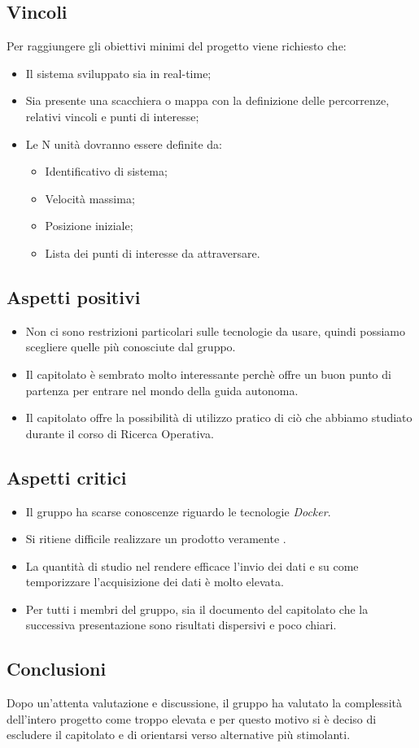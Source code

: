 \subsection{Vincoli}
Per raggiungere gli obiettivi minimi del progetto viene richiesto che:
\begin{itemize}
\item Il sistema sviluppato sia in real-time;
\item Sia presente una scacchiera o mappa con la definizione delle percorrenze, relativi vincoli e punti di interesse;
\item Le N unità dovranno essere definite da:
	\begin{itemize}
	\item Identificativo di sistema;
	\item Velocità massima;
	\item Posizione iniziale;
	\item Lista dei punti di interesse da attraversare.
	\end{itemize}
\end{itemize}

\subsection{Aspetti positivi}
\begin{itemize}
	\item Non ci sono restrizioni particolari sulle tecnologie da usare, quindi possiamo scegliere quelle più conosciute dal gruppo.
	\item Il capitolato è sembrato molto interessante perchè offre un buon punto di partenza per entrare nel mondo della guida autonoma.
	\item Il capitolato offre la possibilità di utilizzo pratico di ciò che abbiamo studiato durante il corso di Ricerca Operativa.
\end{itemize}

\subsection{Aspetti critici}
\begin{itemize}
	\item Il gruppo ha scarse conoscenze riguardo le tecnologie \textit{Docker}.
	\item Si ritiene difficile realizzare un prodotto veramente .
	\item La quantità di studio nel rendere efficace l'invio dei dati e su come temporizzare l'acquisizione dei dati è molto elevata.
	\item Per tutti i membri del gruppo, sia il documento del capitolato che la successiva presentazione sono risultati dispersivi e poco chiari. 
\end{itemize}

\subsection{Conclusioni}
Dopo un'attenta valutazione e discussione, il gruppo ha valutato la complessità dell'intero progetto come troppo elevata e per questo motivo si è deciso di escludere il capitolato e di orientarsi verso alternative più stimolanti.
